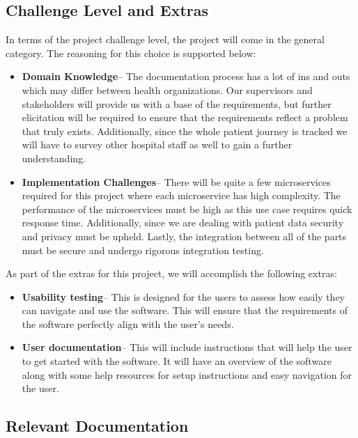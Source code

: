 \documentclass[12pt, titlepage]{article}
\begin{document}
\subsection{Challenge Level and Extras}

In terms of the project challenge level, the project will come in the general category. The reasoning for this choice is supported below:

\begin{itemize}
  \item\textbf{Domain Knowledge}-- The documentation process has a lot of ins and outs which may differ between health organizations. Our supervisors and stakeholders will provide us with a base of the requirements, but further elicitation will be required to ensure that the requirements reflect a problem that truly exists. Additionally, since the whole patient journey is tracked we will have to survey other hospital staff as well to gain a further understanding. 
  \item\textbf{Implementation Challenges}-- There will be quite a few microservices required for this project where each microservice has high complexity. The performance of the microservices must be high as this use case requires quick response time. Additionally, since we are dealing with patient data security and privacy must be upheld. Lastly, the integration between all of the parts must be secure and undergo rigorous integration testing.
\end{itemize}

As part of the extras for this project, we will accomplish the following extras:

\begin{itemize}
  \item\textbf{Usability testing}-- This is designed for the users to assess how easily they can navigate and use the software. This will ensure that the requirements of the software perfectly align with the user's needs.
  \item\textbf{User documentation}-- This will include instructions that will help the user to get started with the software. It will have an overview of the software along with some help resources for setup instructions and easy navigation for the user.
\end{itemize}

\subsection{Relevant Documentation}
\end{document}
